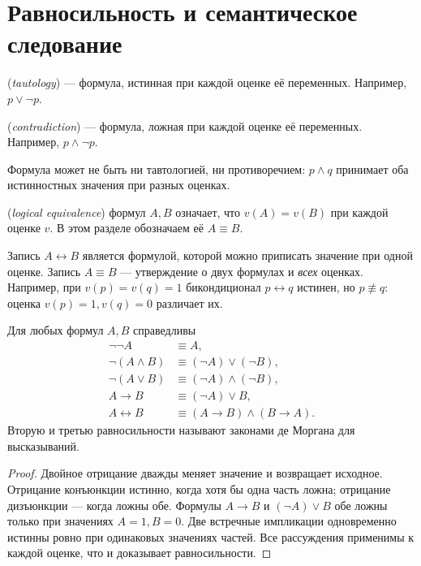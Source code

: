 \section{Равносильность и семантическое следование}
\begin{definition} (\emph{tautology}) — формула, истинная при каждой оценке её переменных. Например, \(p\lor\neg p\).\end{definition}
\begin{definition} (\emph{contradiction}) — формула, ложная при каждой оценке её переменных. Например, \(p\land\neg p\).\end{definition}
Формула может не быть ни тавтологией, ни противоречием: \(p\land q\) принимает оба истинностных значения при разных оценках.
\begin{definition} (\emph{logical equivalence}) формул \(A,B\) означает, что \(v(A)=v(B)\) при каждой оценке \(v\). В этом разделе обозначаем её \(A\equiv B\).\end{definition}
Запись \(A\leftrightarrow B\) является формулой, которой можно приписать значение при одной оценке. Запись \(A\equiv B\) — утверждение о двух формулах и \emph{всех} оценках. Например, при \(v(p)=v(q)=1\) бикондиционал \(p\leftrightarrow q\) истинен, но \(p\not\equiv q\): оценка \(v(p)=1,v(q)=0\) различает их.

\begin{theorem}\label{thm:legacy-c16-3}
Для любых формул \(A,B\) справедливы
\[
\begin{aligned}
\neg\neg A&\equiv A,\\
\neg(A\land B)&\equiv(\neg A)\lor(\neg B),\\
\neg(A\lor B)&\equiv(\neg A)\land(\neg B),\\
A\to B&\equiv(\neg A)\lor B,\\
A\leftrightarrow B&\equiv(A\to B)\land(B\to A).
\end{aligned}
\]
Вторую и третью равносильности называют законами де Моргана для высказываний.
\end{theorem}
\begin{proof}
Двойное отрицание дважды меняет значение и возвращает исходное. Отрицание конъюнкции истинно, когда хотя бы одна часть ложна; отрицание дизъюнкции — когда ложны обе. Формулы \(A\to B\) и \((\neg A)\lor B\) обе ложны только при значениях \(A=1,B=0\). Две встречные импликации одновременно истинны ровно при одинаковых значениях частей. Все рассуждения применимы к каждой оценке, что и доказывает равносильности.
\end{proof}

